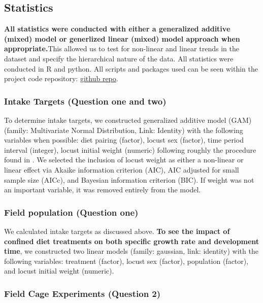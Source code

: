 \documentclass[
]{article}
\begin{document}
\subsection{Statistics}\label{statistics}

\textbf{All statistics were conducted with either a generalized additive
(mixed) model or generlized linear (mixed) model approach when
appropriate.}This allowed us to test for non-linear and linear trends in
the dataset and specify the hierarchical nature of the data. All
statistics were conducted in R and python. All scripts and packages used
can be seen within the project code repository:
\href{https://github.com/ddlawton/herbivore_nutrient_interactions}{github
repo}.

\subsubsection{Intake Targets (Question one and
two)}\label{intake-targets-question-one-and-two}

To determine intake targets, we constructed generalized additive model
(GAM) (family: Multivariate Normal Distribution, Link: Identity) with
the following variables when possible: diet pairing (factor), locust sex
(factor), time period interval (integer), locust initial weight
(numeric) following roughly the procedure found in
\citet{lawton_mismatched_2021}. We selected the inclusion of locust
weight as either a non-linear or linear effect via Akaike information
criterion (AIC), AIC adjusted for small sample size (AICc), and Bayesian
information criterion (BIC). If weight was not an important variable, it
was removed entirely from the model.

\subsubsection{Field population (Question
one)}\label{field-population-question-one}

We calculated intake targets as discussed above. \textbf{To see the
impact of confined diet treatments on both specific growth rate and
development time}, we constructed two linear models (family: gaussian,
link: identity) with the following variables: treatment (factor), locust
sex (factor), population (factor), and locust initial weight (numeric).

\subsubsection{Field Cage Experiments (Question
2)}\label{field-cage-experiments-question-2-1}
\end{document}
